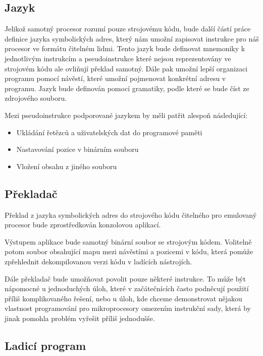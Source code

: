 \subsection{Jazyk}

Jelikož samotný procesor rozumí pouze strojovému kódu, bude další částí práce definice jazyka symbolických adres, který nám umožní zapisovat instrukce pro náš procesor ve formátu čitelném lidmi. Tento jazyk bude definovat mnemoniky k jednotlivým instrukcím a pseudoinstrukce které nejsou reprezentovány ve strojovém kódu ale ovliňují překlad samotný. Dále pak umožní lepší organizaci programu pomocí návěstí, které umožní pojmenovat konkrétní adresu v programu. Jazyk bude definován pomocí gramatiky, podle které se bude číst ze zdrojového souboru.

Mezi pseudoinstrukce podporované jazykem by měli patřit alespoň následující:

\begin{itemize}
	\item Ukládání řetězců a uživatelských dat do programové paměti
	\item Nastavování pozice v binárním souboru
	\item Vložení obsahu z jiného souboru
\end{itemize}

\subsection{Překladač}

Překlad z jazyka symbolických adres do strojového kódu čitelného pro emulovaný procesor bude zprostředkován konzolovou aplikací.

Výstupem aplikace bude samotný binární soubor se strojovým kódem. Volitelně potom soubor obsahující mapu mezi návěstími a pozicemi v kódu, která pomůže zpřehlednit dekompilovanou verzi kódu v ladících nástrojích.

Dále překladač bude umožňovat povolit pouze některé instrukce. To může být nápomocné u jednoduchých úloh, které v začátečnících často podněcují použití příliš komplikovaného řešení, nebo u úloh, kde chceme demonstrovat nějakou vlastnost programování pro mikroprocesory omezením instrukční sady, která by jinak pomohla problém vyřešit příliš jednodušše.

\subsection{Ladicí program}


